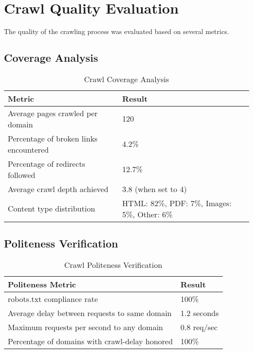 \documentclass[12pt,a4paper]{report}
\begin{document}
\section{Crawl Quality Evaluation}
The quality of the crawling process was evaluated based on several metrics.

\subsection{Coverage Analysis}
\begin{table}[H]
    \centering
    \begin{tabularx}{\textwidth}{|X|X|}
        \hline
        \textbf{Metric} & \textbf{Result} \\
        \hline
        Average pages crawled per domain & 120 \\
        \hline
        Percentage of broken links encountered & 4.2\% \\
        \hline
        Percentage of redirects followed & 12.7\% \\
        \hline
        Average crawl depth achieved & 3.8 (when set to 4) \\
        \hline
        Content type distribution & HTML: 82\%, PDF: 7\%, Images: 5\%, Other: 6\% \\
        \hline
    \end{tabularx}
    \caption{Crawl Coverage Analysis}
\end{table}

\subsection{Politeness Verification}
\begin{table}[H]
    \centering
    \begin{tabularx}{\textwidth}{|X|X|}
        \hline
        \textbf{Politeness Metric} & \textbf{Result} \\
        \hline
        robots.txt compliance rate & 100\% \\
        \hline
        Average delay between requests to same domain & 1.2 seconds \\
        \hline
        Maximum requests per second to any domain & 0.8 req/sec \\
        \hline
        Percentage of domains with crawl-delay honored & 100\% \\
        \hline
    \end{tabularx}
    \caption{Crawl Politeness Verification}
\end{table}
\end{document}
